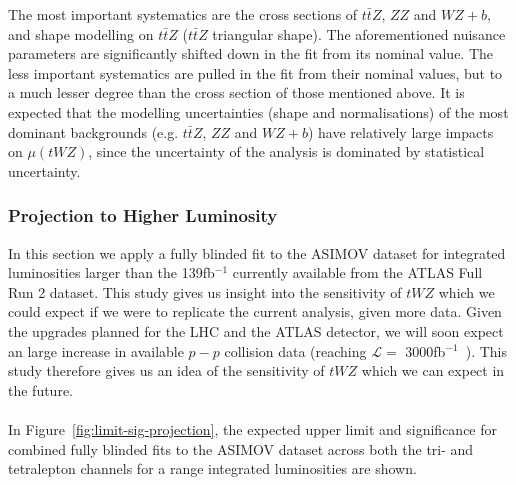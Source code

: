The most important systematics are the cross sections of $t\bar{t}Z$, $ZZ$ and $WZ+b$, and shape modelling on $t\bar{t}Z$ ($t\bar{t}Z$ triangular shape). The aforementioned nuisance parameters are significantly shifted down in the fit from its nominal value. The less important systematics are pulled in the fit from their nominal values, but to a much lesser degree than the cross section of those mentioned above. It is expected that the modelling uncertainties (shape and normalisations) of the most dominant backgrounds (e.g. $t\bar{t}Z$, $ZZ$ and $WZ+b$) have relatively large impacts on $\mu(tWZ)$, since the uncertainty of the analysis is dominated by statistical uncertainty.


\subsubsection{Projection to Higher Luminosity}

In this section we apply a fully blinded fit to the ASIMOV dataset for integrated luminosities larger than the 139fb$^{-1}$ currently available from the ATLAS Full Run 2 dataset. This study gives us insight into the sensitivity of $tWZ$ which we could expect if we were to replicate the current analysis, given more data. Given the upgrades planned for the LHC and the ATLAS detector, we will soon expect an large increase in available $p-p$ collision data (reaching $\mathcal{L} =$ 3000fb$^{-1}$~\cite{HL-LHC-paper}). This study therefore gives us an idea of the sensitivity of $tWZ$ which we can expect in the future. \\\\

In Figure~\ref{fig:limit-sig-projection}, the expected upper limit and significance for combined fully blinded fits to the ASIMOV dataset across both the tri- and tetralepton channels for a range integrated luminosities are shown.

